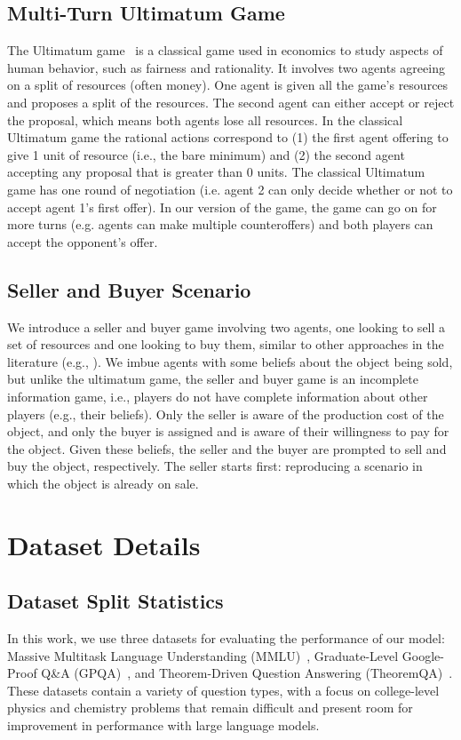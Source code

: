 \subsection{Multi-Turn Ultimatum Game}
The Ultimatum game~\citep{sanfey2003neural} is a classical game used in economics to study aspects of human behavior, such as fairness and rationality. It involves two agents agreeing on a split of resources (often money). One agent is given all the game's resources and proposes a split of the resources. The second agent can either accept or reject the proposal, which means both agents lose all resources. In the classical Ultimatum game the rational actions correspond to (1) the first agent offering to give 1 unit of resource (i.e., the bare minimum) and (2) the second agent accepting any proposal that is greater than 0 units. The classical Ultimatum game has one round of negotiation (i.e. agent 2 can only decide whether or not to accept agent 1's first offer). In our version of the game, the game can go on for more turns (e.g. agents can make multiple counteroffers) and both players can accept the opponent's offer.

\subsection{Seller and Buyer Scenario}
We introduce a seller and buyer game involving two agents, one looking to sell a set of resources and one looking to buy them, similar to other approaches in the literature (e.g., \citep{he2018decoupling}). We imbue agents with some beliefs about the object being sold, but unlike the ultimatum game, the seller and buyer game is an incomplete information game, i.e., players do not have complete information about other players (e.g., their beliefs). Only the seller is aware of the production cost of the object, and only the buyer is assigned and is aware of their willingness to pay for the object. Given these beliefs, the seller and the buyer are prompted to sell and buy the object, respectively. The seller starts first: reproducing a scenario in which the object is already on sale.




\section{Dataset Details}\label{ap:dataset}
\subsection{Dataset Split Statistics}
In this work, we use three datasets for evaluating the performance of our model: Massive Multitask Language Understanding (MMLU)~\citep{hendrycks2020measuring}, Graduate-Level Google-Proof Q\&A (GPQA)~\citep{rein2023gpqa}, and Theorem-Driven Question Answering (TheoremQA)~\citep{chen2023theoremqa}. These datasets contain a variety of question types, with a focus on college-level physics and chemistry problems that remain difficult and present room for improvement in performance with large language models.


